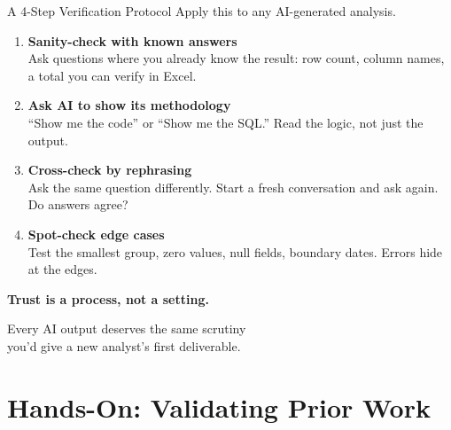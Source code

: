 \documentclass[aspectratio=169]{beamer}
\begin{document}
\begin{frame}{A 4-Step Verification Protocol}
Apply this to \alert{any} AI-generated analysis.
\vspace{0.5cm}
\begin{enumerate}
  \item \textbf{Sanity-check with known answers}\\
  \small Ask questions where you already know the result: row count, column names, a total you can verify in Excel.
  \item \textbf{Ask AI to show its methodology}\\
  \small ``Show me the code'' or ``Show me the SQL.'' Read the logic, not just the output.
  \item \textbf{Cross-check by rephrasing}\\
  \small Ask the same question differently. Start a fresh conversation and ask again. Do answers agree?
  \item \textbf{Spot-check edge cases}\\
  \small Test the smallest group, zero values, null fields, boundary dates. Errors hide at the edges.
\end{enumerate}
\end{frame}

\begin{frame}{}
\vspace{2cm}
\begin{center}
{\Large\bfseries Trust is a process, not a setting.}
\vspace{1cm}

Every AI output deserves the same scrutiny\\you'd give a new analyst's first deliverable.
\end{center}
\end{frame}

\section{Hands-On: Validating Prior Work}
\end{document}
